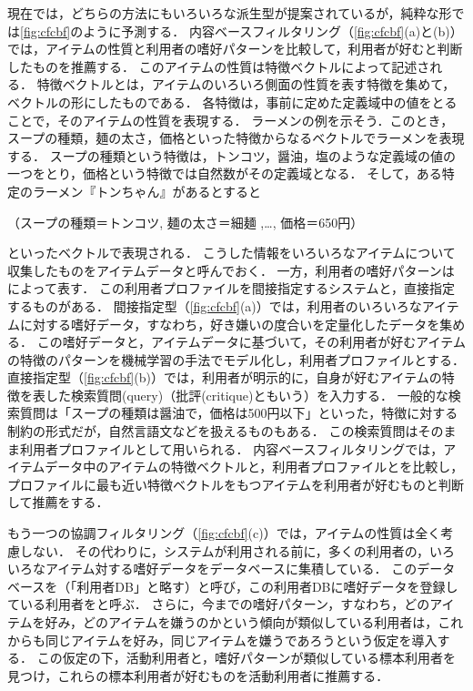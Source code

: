 現在では，どちらの方法にもいろいろな派生型が提案されているが，純粋な形では\ref{fig:cfcbf}のように予測する．
内容ベースフィルタリング（\ref{fig:cfcbf}(a)と(b)）では，アイテムの性質と利用者の嗜好パターンを比較して，利用者が好むと判断したものを推薦する．
このアイテムの性質は特徴ベクトルによって記述される．
特徴ベクトルとは，アイテムのいろいろ側面の性質を表す特徴を集めて，ベクトルの形にしたものである．
各特徴は，事前に定めた定義域中の値をとることで，そのアイテムの性質を表現する．
ラーメンの例を示そう．このとき，スープの種類，麺の太さ，価格といった特徴からなるベクトルでラーメンを表現する．
スープの種類という特徴は，トンコツ，醤油，塩のような定義域の値の一つをとり，価格という特徴では自然数がその定義域となる．
そして，ある特定のラーメン『トンちゃん』があるとすると
\begin{center}
\footnotesize
（スープの種類＝トンコツ, 麺の太さ＝細麺 ,…, 価格＝650円）
\end{center}
といったベクトルで表現される．
こうした情報をいろいろなアイテムについて収集したものをアイテムデータと呼んでおく．
一方，利用者の嗜好パターンはによって表す．
この利用者プロファイルを間接指定するシステムと，直接指定するものがある．
間接指定型（\ref{fig:cfcbf}(a)）では，利用者のいろいろなアイテムに対する嗜好データ，すなわち，好き嫌いの度合いを定量化したデータを集める．
この嗜好データと，アイテムデータに基づいて，その利用者が好むアイテムの特徴のパターンを機械学習の手法でモデル化し，利用者プロファイルとする．
直接指定型（\ref{fig:cfcbf}(b)）では，利用者が明示的に，自身が好むアイテムの特徴を表した検索質問(query)（批評(critique)ともいう）を入力する．
一般的な検索質問は「スープの種類は醤油で，価格は500円以下」といった，特徴に対する制約の形式だが，自然言語文などを扱えるものもある．
この検索質問はそのまま利用者プロファイルとして用いられる．
内容ベースフィルタリングでは，アイテムデータ中のアイテムの特徴ベクトルと，利用者プロファイルとを比較し，プロファイルに最も近い特徴ベクトルをもつアイテムを利用者が好むものと判断して推薦をする．

もう一つの協調フィルタリング（\ref{fig:cfcbf}(c)）では，アイテムの性質は全く考慮しない．
その代わりに，システムが利用される前に，多くの利用者の，いろいろなアイテム対する嗜好データをデータベースに集積している．
このデータベースを（「利用者DB」と略す）と呼び，この利用者DBに嗜好データを登録している利用者をと呼ぶ．
さらに，今までの嗜好パターン，すなわち，どのアイテムを好み，どのアイテムを嫌うのかという傾向が類似している利用者は，これからも同じアイテムを好み，同じアイテムを嫌うであろうという仮定を導入する．
この仮定の下，活動利用者と，嗜好パターンが類似している標本利用者を見つけ，これらの標本利用者が好むものを活動利用者に推薦する．

